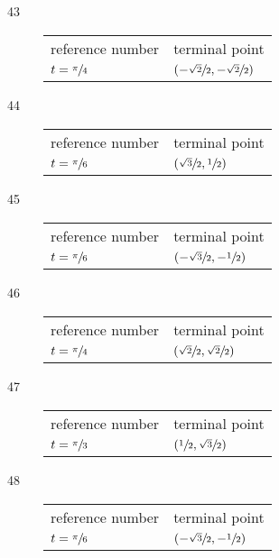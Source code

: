 \documentclass{exam}
\begin{document}
\begin{description}
      \item[43]
        \begin{tabular}[H]{ll}
          \toprule
          reference number    & terminal point \\
          $t = \sfrac{\pi}{4}$ & $\left( - \sfrac{\sqrt{2}}{2}, - \sfrac{\sqrt{2}}{2} \right)$ \\
          \bottomrule
        \end{tabular}

      \item[44]
        \begin{tabular}[H]{ll}
          \toprule
          reference number    & terminal point \\
          $t = \sfrac{\pi}{6}$ & $\left( \sfrac{\sqrt{3}}{2}, \sfrac{1}{2} \right)$ \\
          \bottomrule
        \end{tabular}

      \item[45]
        \begin{tabular}[H]{ll}
          \toprule
          reference number    & terminal point \\
          $t = \sfrac{\pi}{6}$ & $\left( - \sfrac{\sqrt{3}}{2}, - \sfrac{1}{2} \right)$ \\
          \bottomrule
        \end{tabular}

      \item[46]
        \begin{tabular}[H]{ll}
          \toprule
          reference number    & terminal point \\
          $t = \sfrac{\pi}{4}$ & $\left( \sfrac{\sqrt{2}}{2}, \sfrac{\sqrt{2}}{2} \right)$ \\
          \bottomrule
        \end{tabular}

      \item[47]
        \begin{tabular}[H]{ll}
          \toprule
          reference number    & terminal point \\
          $t = \sfrac{\pi}{3}$ & $\left( \sfrac{1}{2}, \sfrac{\sqrt{3}}{2} \right)$ \\
          \bottomrule
        \end{tabular}

      \item[48]
        \begin{tabular}[H]{ll}
          \toprule
          reference number    & terminal point \\
          $t = \sfrac{\pi}{6}$ & $\left( - \sfrac{\sqrt{3}}{2}, - \sfrac{1}{2} \right)$ \\
          \bottomrule
        \end{tabular}


\end{description}
\end{document}
